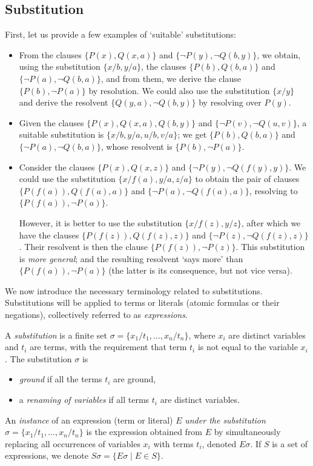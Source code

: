 \subsection{Substitution}

First, let us provide a few examples of `suitable' substitutions:

\begin{example}\label{example:substitutions}
\begin{itemize}
    \item From the clauses $\{P(x),Q(x,a)\}$ and $\{\neg P(y),\neg Q(b,y)\}$, we obtain, using the substitution $\{x/b,y/a\}$, the clauses $\{P(b),Q(b,a)\}$ and $\{\neg P(a),\neg Q(b,a)\}$, and from them, we derive the clause $\{P(b),\neg P(a)\}$ by resolution. We could also use the substitution $\{x/y\}$ and derive the resolvent $\{Q(y,a),\neg Q(b,y)\}$ by resolving over $P(y)$.
    \item Given the clauses $\{P(x),Q(x,a),Q(b,y)\}$ and $\{\neg P(v),\neg Q(u,v)\}$, a suitable substitution is $\{x/b,y/a,u/b,v/a\}$; we get $\{P(b),Q(b,a)\}$ and $\{\neg P(a),\neg Q(b,a)\}$, whose resolvent is $\{P(b),\neg P(a)\}$.
    \item Consider the clauses $\{P(x),Q(x,z)\}$ and $\{\neg P(y),\neg Q(f(y),y)\}$. We could use the substitution $\{x/f(a),y/a,z/a\}$ to obtain the pair of clauses $\{P(f(a)),Q(f(a),a)\}$ and $\{\neg P(a),\neg Q(f(a),a)\}$, resolving to $\{P(f(a)),\neg P(a)\}$.

    However, it is better to use the substitution $\{x/f(z),y/z\}$, after which we have the clauses $\{P(f(z)),Q(f(z),z)\}$ and $\{\neg P(z),\neg Q(f(z),z)\}$. Their resolvent is then the clause $\{P(f(z)),\neg P(z)\}$. This substitution is \emph{more general}; and the resulting resolvent `says more' than $\{P(f(a)),\neg P(a)\}$ (the latter is its consequence, but not vice versa).
\end{itemize}
\end{example}

We now introduce the necessary terminology related to substitutions. Substitutions will be applied to terms or literals (atomic formulas or their negations), collectively referred to as \emph{expressions}.

\begin{definition}[Substitution]
    A \emph{substitution} is a finite set $\sigma=\{x_1/t_1,\dots,x_n/t_n\}$, where $x_i$ are distinct variables and $t_i$ are terms, with the requirement that term $t_i$ is not equal to the variable $x_i$. The substitution $\sigma$ is 
    \begin{itemize}
        \item \emph{ground} if all the terms $t_i$ are ground,
        \item a \emph{renaming of variables} if all terms $t_i$ are distinct variables.
    \end{itemize}
    An \emph{instance} of an expression (term or literal) $E$ \emph{under the substitution $\sigma=\{x_1/t_1,\dots,x_n/t_n\}$} is the expression obtained from $E$ by simultaneously replacing all occurrences of variables $x_i$ with terms $t_i$, denoted $E\sigma$. If $S$ is a set of expressions, we denote $S\sigma=\{E\sigma\mid E\in S\}$.
\end{definition}

